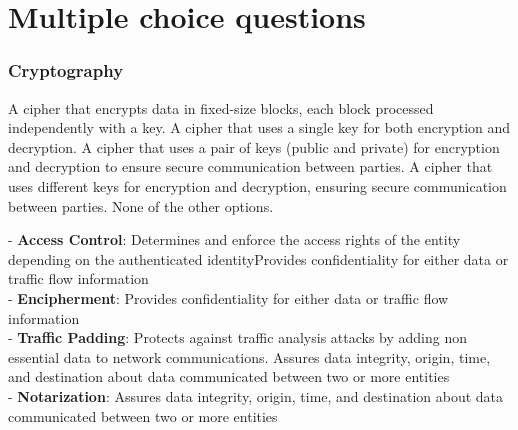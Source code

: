 \part{Multiple choice questions}

\begin{questions}

    \section{Cryptography}





    \begin{checkboxes}
        \choice A cipher that encrypts data in fixed-size blocks, each block processed independently with a key.
        \choice A cipher that uses a single key for both encryption and decryption.
        \CorrectChoice A cipher that uses a pair of keys (public and private) for encryption and decryption to ensure secure communication between parties.
        \CorrectChoice A cipher that uses different keys for encryption and decryption, ensuring secure communication between parties.
        \choice None of the other options.
    \end{checkboxes}


    \begin{solution}
        - \textbf{Access Control}: Determines and enforce the access rights of the entity depending on the authenticated identityProvides confidentiality for either data or traffic flow information \\
        - \textbf{Encipherment}: Provides confidentiality for either data or traffic flow information \\
        - \textbf{Traffic Padding}: Protects against traffic analysis attacks by adding non essential data to network communications. Assures data integrity, origin, time, and destination about data communicated between two or more entities \\
        - \textbf{Notarization}: Assures data integrity, origin, time, and destination about data communicated between two or more entities \\
    \end{solution}


\end{questions}

